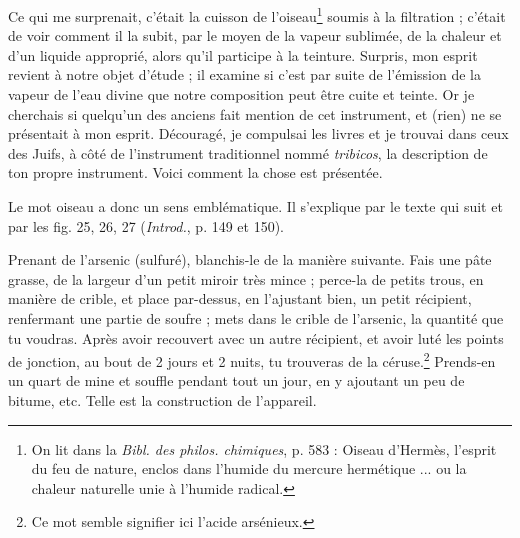 \documentclass[a4paper, 11pt, oneside, polutonikogreek, french]{article}
\begin{document}
Ce qui me surprenait, c'était la cuisson de l'oiseau\footnote{On lit dans la \emph{Bibl. des philos. chimiques}, p. 583 : Oiseau d'Hermès, l'esprit du feu de nature, enclos dans l'humide du mercure hermétique ... ou la chaleur naturelle unie à l'humide radical.  } soumis à la filtration ; c'était de voir comment il la subit, par le moyen de la vapeur sublimée, de la chaleur et d'un liquide approprié, alors qu'il participe à la teinture. Surpris, mon esprit revient à notre objet d'étude ; il examine si c'est par suite de l'émission de la vapeur de l'eau divine que notre composition peut être cuite et teinte. Or je cherchais si quelqu'un des anciens fait mention de cet instrument, et (rien) ne se présentait à mon esprit. Découragé, je compulsai les livres et je trouvai dans ceux des Juifs, à côté de l'instrument traditionnel nommé \emph{tribicos}, la description de ton propre instrument. Voici comment la chose est présentée.

Le mot oiseau a donc un sens emblématique. Il s'explique par le texte qui suit et par les fig. 25, 26, 27 (\emph{Introd.}, p. 149 et 150).

Prenant de l'arsenic (sulfuré), blanchis-le de la manière suivante. Fais une pâte grasse, de la largeur d'un petit miroir très mince ; perce-la de petits trous, en manière de crible, et place par-dessus, en l'ajustant bien, un petit récipient, renfermant une partie de soufre ; mets dans le crible de l'arsenic, la quantité que tu voudras. Après avoir recouvert avec un autre récipient, et avoir luté les points de jonction, au bout de 2 jours et 2 nuits, tu trouveras de la céruse.\footnote{Ce mot semble signifier ici l'acide arsénieux.} Prends-en un quart de mine et souffle pendant tout un jour, en y ajoutant un peu de bitume, etc. Telle est la construction de l'appareil.
\end{document}

